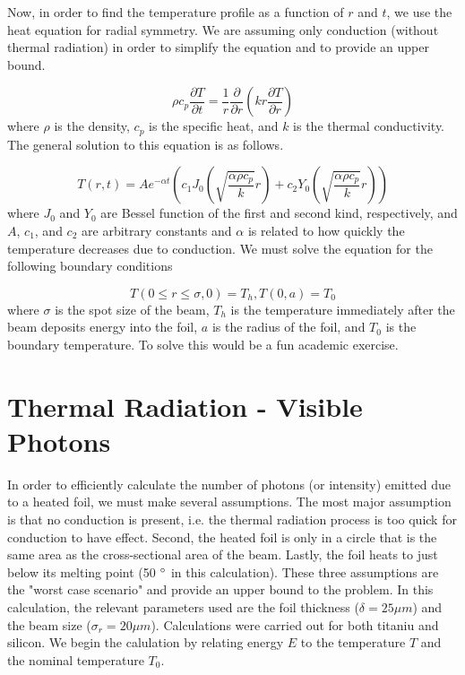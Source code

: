\documentclass[12pt]{article}
\begin{document}
Now, in order to find the temperature profile as a function of $r$ and $t$, we use the heat equation for radial symmetry. We are assuming only conduction (without thermal radiation) in order to simplify the equation and to provide an upper bound.

\begin{equation}
\rho c_p \frac{\partial T}{\partial t}=\frac{1}{r} \frac{\partial}{\partial r} \left( k r \frac{\partial T}{\partial r} \right)
\end{equation}
where $\rho$ is the density, $c_p$ is the specific heat, and $k$ is the thermal conductivity. The general solution to this equation is as follows.

\begin{equation}
T(r,t)=Ae^{-\alpha t} \left( c_1 J_0 \left( \sqrt{\frac{\alpha \rho c_p}{k}}r \right)+c_2 Y_0 \left( \sqrt{\frac{\alpha \rho c_p}{k}}r \right) \right)
\end{equation}
where $J_0$ and $Y_0$ are Bessel function of the first and second kind, respectively, and $A$, $c_1$, and $c_2$ are arbitrary constants and $\alpha$ is related to how quickly the temperature decreases due to conduction. We must solve the equation for the following boundary conditions

\begin{equation}
T(0 \le r \le \sigma,0)=T_h, T(0,a)=T_0
\end{equation}
where $\sigma$ is the spot size of the beam, $T_h$ is the temperature immediately after the beam deposits energy into the foil, $a$ is the radius of the foil, and $T_0$ is the boundary temperature. To solve this would be a fun academic exercise.

\section{Thermal Radiation - Visible Photons}

In order to efficiently calculate the number of photons (or intensity) emitted due to a heated foil, we must make several assumptions. The most major assumption is that no conduction is present, i.e. the thermal radiation process is too quick for conduction to have effect. Second, the heated foil is only in a circle that is the same area as the cross-sectional area of the beam. Lastly, the foil heats to just below its melting point (50 $\degree$ in this calculation). These three assumptions are the "worst case scenario" and provide an upper bound to the problem. In this calculation, the relevant parameters used are the foil thickness ($\delta=25 \mu m$) and the beam size ($\sigma_r = 20 \mu m$). Calculations were carried out for both titaniu and silicon. We begin the calulation by relating energy $E$ to the temperature $T$ and the nominal temperature $T_0$.
\end{document}
